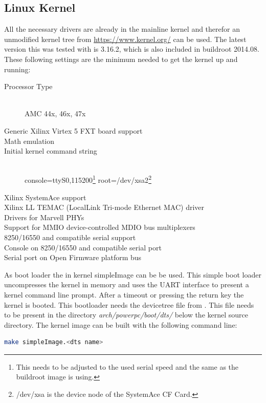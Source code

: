 \documentclass[11pt,technote,a4paper,onecolumn,dvips]{IEEEtran}
\begin{document}
\subsection{Linux Kernel}
All the necessary drivers are already in the mainline kernel and therefor an unmodified
kernel tree from \url{https://www.kernel.org/} can be used. The latest version this
was tested with is 3.16.2, which is also included in buildroot 2014.08.
These following settings are the minimum needed to get the kernel up and running:
\begin{description}
    \item[Processor Type] \hfill \\ AMC 44x, 46x, 47x
    \item[Generic Xilinx Virtex 5 FXT board support]
    \item[Math emulation]
    \item[Initial kernel command string] \hfill \\
        console=ttyS0,115200\footnote{This needs to be adjusted to the used
        serial speed and the same as the buildroot image is using.}
        root=/dev/xsa2\footnote{/dev/xsa is the device node of the SystemAce CF
        Card.}
    \item[Xilinx SystemAce support]
    \item[Xilinx LL TEMAC (LocalLink Tri-mode Ethernet MAC) driver]
    \item[Drivers for Marvell PHYs]
    \item[Support for MMIO device-controlled MDIO bus multiplexers]
    \item[8250/16550 and compatible serial support]
    \item[Console on 8250/16550 and compatible serial port]
    \item[Serial port on Open Firmware platform bus]
\end{description}
As boot loader the in kernel simpleImage can be be used. This simple boot
loader uncompresses the kernel in memory and uses the UART interface to
present a kernel command line prompt. After a timeout or pressing the
return key the kernel is booted. This bootloader needs the devicetree
file from . This file needs to be present in the
directory \emph{arch/powerpc/boot/dts/} below the kernel source
directory. The kernel image can be built with the following command
line:
\begin{lstlisting}[language=bash,basicstyle=\ttfamily\tiny]
make simpleImage.<dts name>
\end{lstlisting}
\end{document}
